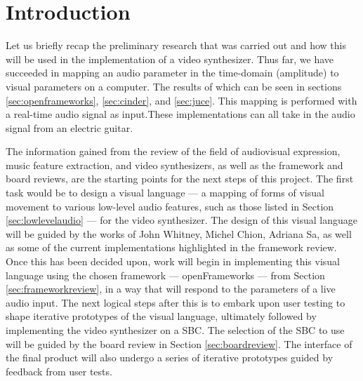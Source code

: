 \documentclass[../initial_thesis.tex]{subfiles}
\begin{document}
\section{Introduction}


Let us briefly recap the preliminary research that was carried out and how this will be used in the implementation of a video synthesizer. Thus far, we have succeeded in mapping an audio parameter in the time-domain (amplitude) to visual parameters on a computer. The results of which can be seen in sections \ref{sec:openframeworks}, \ref{sec:cinder}, and \ref{sec:juce}. This mapping is performed with a real-time audio signal as input.\footnotemark These implementations can all take in the audio signal from an electric guitar. \par
{}

The information gained from the review of the field of audiovisual expression, music feature extraction, and video synthesizers, as well as the framework and board reviews, are the starting points for the next steps of this project. The first task would be to design a visual language --- a mapping of forms of visual movement to various low-level audio features, such as those listed in Section \ref{sec:lowlevelaudio} --- for the video synthesizer. The design of this visual language will be guided by the works of John Whitney, Michel Chion, Adriana Sa, as well as some of the current implementations highlighted in the framework review. Once this has been decided upon, work will begin in implementing this visual language using the chosen framework --- openFrameworks --- from Section \ref{sec:frameworkreview}, in a way that will respond to the parameters of a live audio input. The next logical steps after this is to embark upon user testing to shape iterative prototypes of the visual language, ultimately followed by implementing the video synthesizer on a SBC. The selection of the SBC to use will be guided by the board review in Section \ref{sec:boardreview}. The interface of the final product will also undergo a series of iterative prototypes guided by feedback from user tests.
\end{document}
